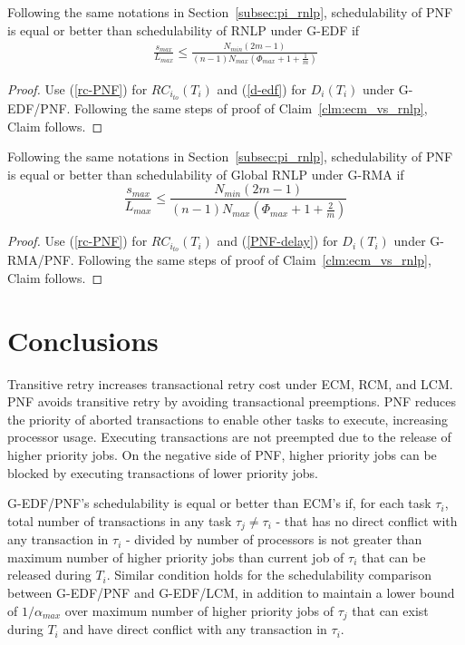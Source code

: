 %
\begin{clm}\label{clm:gedf_pnf_vs_rnlp}
%
Following the same notations in Section~\ref{subsec:pi_rnlp}, schedulability of PNF is equal or better than schedulability of RNLP under G-EDF if 
%
\begin{eqnarray}
%
\frac{s_{max}}{L_{max}} \le \frac{N_{min}\left(2m-1\right)}{\left(n-1\right)N_{max}\left(\Phi_{max}+1+\frac{1}{m}\right)}
\label{eq:gedf_pnf_rnlp_cmp_final}
%
\end{eqnarray}
%
\end{clm}
%
\begin{proof}
%
Use (\ref{rc-PNF}) for $RC_{i_{to}}(T_i)$ and (\ref{d-edf}) for $D_i(T_i)$ under G-EDF/PNF. Following the same steps of proof of Claim~\ref{clm:ecm_vs_rnlp}, Claim follows.
%
\end{proof}
%
\begin{clm}\label{clm:grma_pnf_vs_rnlp}
%
Following the same notations in Section~\ref{subsec:pi_rnlp}, schedulability of PNF is equal or better than schedulability of Global RNLP under G-RMA if 
%
\begin{equation}
\frac{s_{max}}{L_{max}}\le\frac{N_{min}\left(2m-1\right)}{\left(n-1\right)N_{max}\left(\Phi_{max}+1+\frac{2}{m}\right)}
\label{eq:grma_pnf_rnlp_cmp_final}
\end{equation}
%
\end{clm}
%
\begin{proof}
%
Use (\ref{rc-PNF}) for $RC_{i_{to}}(T_i)$ and (\ref{PNF-delay}) for $D_i(T_i)$ under G-RMA/PNF. Following the same steps of proof of Claim~\ref{clm:ecm_vs_rnlp}, Claim follows.
%
\end{proof}
%
\section{Conclusions}\label{pnf_conclusion}
%
Transitive retry increases transactional retry cost under ECM, RCM, and LCM. PNF avoids transitive retry by avoiding transactional preemptions. PNF reduces the priority of aborted transactions to enable other tasks to execute, increasing processor usage. Executing transactions are not preempted due to the release of higher priority jobs. On the negative side of PNF, higher priority jobs can be blocked by executing transactions of lower priority jobs. 

G-EDF/PNF's schedulability is equal or better than ECM's if, for each task $\tau_i$, total number of transactions in any task $\tau_{j}\neq\tau_{i}$ - that has no direct conflict with any transaction in $\tau_{i}$ - divided by number of processors is not greater than maximum number of higher priority jobs than current job of $\tau_{i}$ that can be released during $T_{i}$. Similar condition holds for the schedulability comparison between G-EDF/PNF and G-EDF/LCM, in addition to maintain a lower bound of $1/\alpha_{max}$ over maximum number of higher priority jobs of $\tau_j$ that can exist during $T_i$ and have direct conflict with any transaction in $\tau_i$. 

